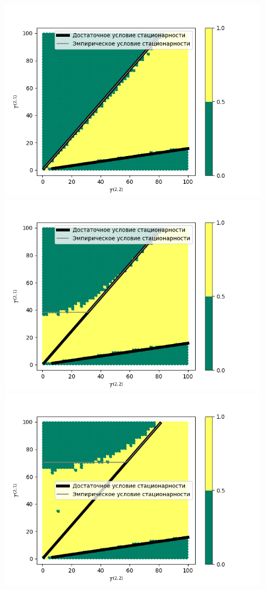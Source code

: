 \documentclass{report}
\begin{document}
\begin{figure}
\begin{multicols}{2}
    \includegraphics[width=1.15\linewidth]{0_1_thres_-1_fact.png}\par 
    \includegraphics[width=1.15\linewidth]{0_1_thres_5_fact.png}\par 
    \end{multicols}
\begin{multicols}{2}
    \includegraphics[width=1.15\linewidth]{0_1_thres_10_fact.png}\par

\end{multicols}
\end{figure}
\end{document}

